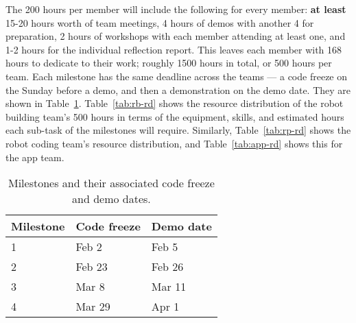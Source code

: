 \documentclass{article}
\begin{document}
The 200 hours per member will include the following for every member: {\bf at least} 15-20 hours worth of team meetings, 4 hours of demos with another 4 for preparation, 2 hours of workshops with each member attending at least one, and 1-2 hours for the individual reflection report. This leaves each member with 168 hours to dedicate to their work; roughly 1500 hours in total, or 500 hours per team. Each milestone has the same deadline across the teams --- a code freeze on the Sunday before a demo, and then a demonstration on the demo date. They are shown in Table~\ref{tab:demo-dates}. Table~\ref{tab:rb-rd} shows the resource distribution of the robot building team's 500 hours in terms of the equipment, skills, and estimated hours each sub-task of the milestones will require. Similarly, Table~\ref{tab:rp-rd} shows the robot coding team's resource distribution, and Table~\ref{tab:app-rd} shows this for the app team.

\begin{table}[]
  \begin{center}
  \begin{tabular}{lll}
    \hline
    Milestone & Code freeze & Demo date \\
    \hline
    1 & Feb 2 & Feb 5 \\
    2 & Feb 23 & Feb 26 \\
    3 & Mar 8 & Mar 11 \\
    4 & Mar 29 & Apr 1 \\
    \hline
  \end{tabular}
  \end{center}
  \caption{Milestones and their associated code freeze and demo dates.}
  \label{tab:demo-dates}
\end{table}
\end{document}
